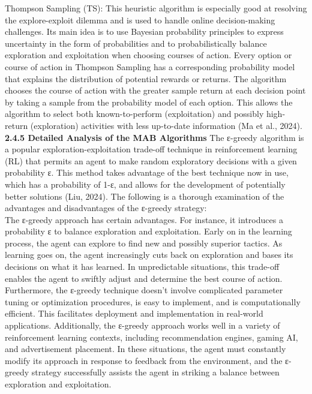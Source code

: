 \documentclass[a4paper,11pt,onecolumn]{article}
\begin{document}
Thompson Sampling (TS): This heuristic algorithm is especially good at resolving the explore-exploit dilemma and is used to handle online decision-making challenges. Its main idea is to use Bayesian probability principles to express uncertainty in the form of probabilities and to probabilistically balance exploration and exploitation when choosing courses of action. Every option or course of action in Thompson Sampling has a corresponding probability model that explains the distribution of potential rewards or returns. The algorithm chooses the course of action with the greater sample return at each decision point by taking a sample from the probability model of each option. This allows the algorithm to select both known-to-perform (exploitation) and possibly high-return (exploration) activities with less up-to-date information (Ma et al., 2024).\newline \\
\textbf{2.4.5 Detailed Analysis of the MAB Algorithms}
The ε-greedy algorithm is a popular exploration-exploitation trade-off technique in reinforcement learning (RL) that permits an agent to make random exploratory decisions with a given probability ε. This method takes advantage of the best technique now in use, which has a probability of 1-ε, and allows for the development of potentially better solutions (Liu, 2024). The following is a thorough examination of the advantages and disadvantages of the ε-greedy strategy:\\
The ε-greedy approach has certain advantages. For instance, it introduces a probability ε to balance exploration and exploitation. Early on in the learning process, the agent can explore to find new and possibly superior tactics. As learning goes on, the agent increasingly cuts back on exploration and bases its decisions on what it has learned. In unpredictable situations, this trade-off enables the agent to swiftly adjust and determine the best course of action.\\ 
Furthermore, the ε-greedy technique doesn't involve complicated parameter tuning or optimization procedures, is easy to implement, and is computationally efficient. This facilitates deployment and implementation in real-world applications. Additionally, the ε-greedy approach works well in a variety of reinforcement learning contexts, including recommendation engines, gaming AI, and advertisement placement. In these situations, the agent must constantly modify its approach in response to feedback from the environment, and the ε-greedy strategy successfully assists the agent in striking a balance between exploration and exploitation.\\
\end{document}
